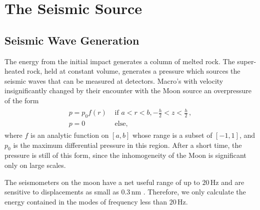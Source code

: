 \documentclass[prd,reprint,10pt]{revtex4-1}
\newcommand*\te[1]{\text{#1}}
\newcommand*\f[2]{\frac{#1}{#2}}
\begin{document}
\section{The Seismic Source}
\subsection{Seismic Wave Generation}
The energy from the initial impact generates a column of melted rock. The super-heated rock, held at constant volume, generates a pressure which sources the seismic waves that can be measured at detectors. Macro's with velocity insignificantly changed by their encounter with the Moon source an overpressure of the form
\begin{align}
\begin{array}{cc}p = p_0 f(r)&\te{ if }a<r<b,-\f h2<z<\f h2\,,\\ p = 0&\te{ else,}\end{array}
\end{align}
where $f$ is an analytic function on $[a,b]$ whose range is a subset of $[-1,1]$, and $p_0$ is the maximum differential pressure in this region. After a short time, the pressure is still of this form, since the inhomogeneity of the Moon is significant only on large scales.

The seismometers on the moon have a net useful range of up to $20\,\te{Hz}$ and are sensitive to displacements as small as $0.3\,\text{nm}$ \cite{latham1973lunar}\cite{nakamura1982apollo}. Therefore, we only calculate the energy contained in the modes of frequency less than $20\,\te{Hz}$. 
\end{document}
